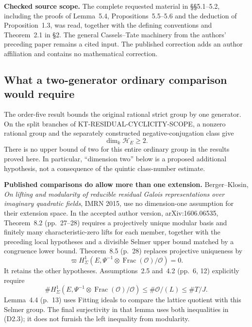 \documentclass[11pt,a4paper]{article}
\theoremstyle{definition}
\renewcommand{\paragraph}[1]{\par\smallskip\noindent\textbf{#1}\quad\ignorespaces}
\begin{document}
\paragraph{Checked source scope.}
The complete requested material in \S\S5.1--5.2, including the proofs
of Lemma~5.4, Propositions~5.5--5.6 and the deduction of Proposition~1.3,
was read, together with the defining conventions and Theorem~2.1 in
\S2.  The general Cassels--Tate machinery from the authors' preceding
paper remains a cited input.  The published correction
 adds an author affiliation and
contains no mathematical correction.



\subsection{What a two-generator ordinary comparison would require}

The order-five result bounds the original rational strict group by
one generator.  On the split branches of
KT-RESIDUAL-CYCLICITY-SCOPE, a nonzero rational group and the
separately constructed negative-conjugation class give
\[
 \dim_k\mathcal H_E\geq2.                                      \tag{D2.1}
\]
There is no upper bound of two for this entire ordinary group in
the results proved here.  In particular, ``dimension two'' below
is a proposed additional hypothesis, not a consequence of the
quintic class-number estimate.

\paragraph{Published comparisons do allow more than one extension.}
Berger--Klosin, \emph{On lifting and modularity of reducible residual
Galois representations over imaginary quadratic fields}, IMRN 2015,
use no dimension-one assumption for their extension space.
In the accepted author version, arXiv:1606.06535, Theorem~8.2
(pp.~27--28) requires a projectively unique modular basis and
finitely many characteristic-zero lifts for each member, together
with the preceding local hypotheses and a divisible Selmer upper
bound matched by a congruence lower bound.  Theorem~8.5 (p.~28)
replaces projective uniqueness by
\[
 \varpi H^1_\Sigma
       (E,\Psi^{-1}\otimes\operatorname{Frac}(\mathcal O)/\mathcal O)
       =0.                                                     \tag{D2.2}
\]
It retains the other hypotheses.  Assumptions~2.5 and~4.2
(pp.~6, 12) explicitly require
\[
 \#H^1_\Sigma(E,\Psi^{-1}\otimes
              \operatorname{Frac}(\mathcal O)/\mathcal O)
       \leq\#\mathcal O/(L)\leq\#T/J.                          \tag{D2.3}
\]
Lemma~4.4 (p.~13) uses Fitting ideals to compare the lattice
quotient with this Selmer group.  The final surjectivity in that
lemma uses both inequalities in (D2.3); it does not furnish the
left inequality from modularity.
\end{document}
